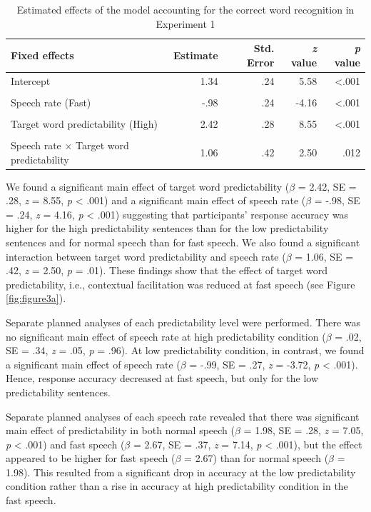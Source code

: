 \documentclass[a4paper, nobind]{templates/ociamthesis}
\begin{document}
\begin{table}[ht]
\begin{center}
\caption{Estimated effects of the model accounting for the correct word recognition in Experiment 1}
\label{results3a} 
\vskip 0.12in
\begin{tabular}[]{@{}lrrrr@{}}
\toprule
Fixed effects & Estimate & Std. Error & \emph{z} value & \emph{p}
value \\
\midrule
Intercept & 1.34 & .24 & 5.58 & \textless.001 \\
\\
Speech rate (Fast) & -.98 & .24 & -4.16 & \textless.001 \\
\\
Target word predictability (High) & 2.42 & .28 & 8.55 & \textless.001 \\
\\
Speech rate $\times$ Target word predictability & 1.06 & .42 & 2.50 & .012 \\
\bottomrule
\end{tabular} 
\end{center} 
\end{table}

We found a significant main effect of target word predictability (\(\beta\) = 2.42, SE = .28, \emph{z} = 8.55, \emph{p} \textless{} .001) and a significant main effect of speech rate (\(\beta\) = -.98, SE = .24, \emph{z} = 4.16, \emph{p} \textless{} .001)
suggesting that participants' response accuracy was higher for the high predictability sentences than for the low predictability sentences and for normal speech than for fast speech.
We also found a significant interaction between target word predictability and speech rate (\(\beta\) = 1.06, SE = .42, \emph{z} = 2.50, \emph{p} = .01).
These findings show that the effect of target word predictability, i.e., contextual facilitation was reduced at fast speech (see Figure \ref{fig:figure3a}).

Separate planned analyses of each predictability level were performed.
There was no significant main effect of speech rate at high predictability condition (\(\beta\) = .02, SE = .34, \emph{z} = .05, \emph{p} = .96).
At low predictability condition, in contrast, we found a significant main effect of speech rate (\(\beta\) = -.99, SE = .27, \emph{z} = -3.72, \emph{p} \textless{} .001).
Hence, response accuracy decreased at fast speech, but only for the low predictability sentences.

Separate planned analyses of each speech rate revealed that there was significant main effect of predictability in both normal speech (\(\beta\) = 1.98, SE = .28, \emph{z} = 7.05, \emph{p} \textless{} .001) and fast speech (\(\beta\) = 2.67, SE = .37, \emph{z} = 7.14, \emph{p} \textless{} .001),
but the effect appeared to be higher for fast speech (\(\beta\) = 2.67) than for normal speech (\(\beta\) = 1.98).
This resulted from a significant drop in accuracy at the low predictability condition rather than a rise in accuracy at high predictability condition in the fast speech.
\end{document}
